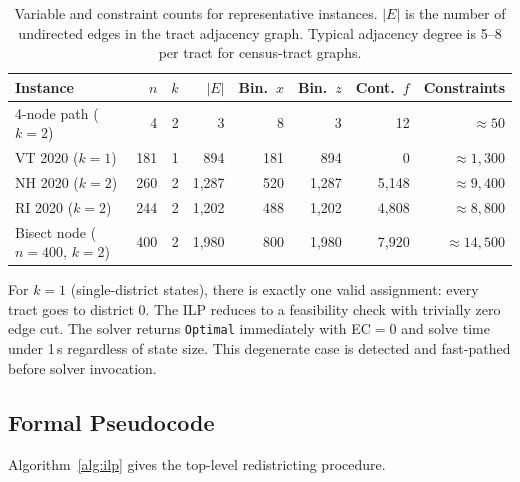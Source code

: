 \begin{table}[t]
\centering
\caption{%
  Variable and constraint counts for representative instances.
  $|E|$ is the number of undirected edges in the tract adjacency graph.
  Typical adjacency degree is 5--8 per tract for census-tract graphs.
}
\label{tab:var-counts}
\renewcommand{\arraystretch}{1.3}
\begin{tabular}{@{}lrrrrrrr@{}}
\toprule
Instance & $n$ & $k$ & $|E|$ & Bin.\ $x$ & Bin.\ $z$ & Cont.\ $f$ & Constraints \\
\midrule
4-node path ($k=2$)   & 4   & 2 & 3  & 8   & 3   & 12  & $\approx 50$ \\
VT 2020 ($k=1$)        & 181 & 1 & 894 & 181 & 894 & 0   & $\approx 1{,}300$ \\
NH 2020 ($k=2$)        & 260 & 2 & 1{,}287 & 520 & 1{,}287 & 5{,}148 & $\approx 9{,}400$ \\
RI 2020 ($k=2$)        & 244 & 2 & 1{,}202 & 488 & 1{,}202 & 4{,}808 & $\approx 8{,}800$ \\
Bisect node ($n=400$, $k=2$) & 400 & 2 & 1{,}980 & 800 & 1{,}980 & 7{,}920 & $\approx 14{,}500$ \\
\bottomrule
\end{tabular}
\end{table}

\begin{remark}[$k=1$ degenerate case]
For $k=1$ (single-district states), there is exactly one valid assignment:
every tract goes to district 0.
The ILP reduces to a feasibility check with trivially zero edge cut.
The solver returns \texttt{Optimal} immediately with EC$= 0$ and solve
time under 1\,s regardless of state size.
This degenerate case is detected and fast-pathed before solver invocation.
\end{remark}

\subsection{Formal Pseudocode}

Algorithm~\ref{alg:ilp} gives the top-level \ilp{} redistricting procedure.

